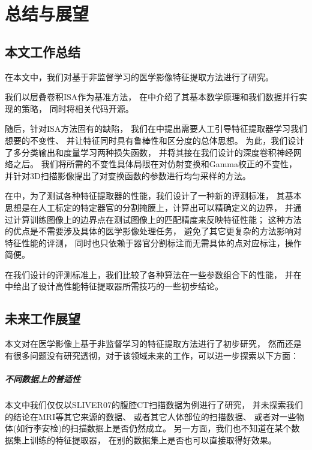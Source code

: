 
\chapter{总结与展望\label{chap:discuss}}

\section{本文工作总结}
在本文中，我们对基于非监督学习的医学影像特征提取方法进行了研究。

我们以层叠卷积ISA作为基准方法，
在中介绍了其基本数学原理和我们数据并行实现的策略，
同时将相关代码开源。

随后，针对ISA方法固有的缺陷，
我们在中提出需要人工引导特征提取器学习我们想要的不变性、
并让特征同时具有鲁棒性和区分度的总体思想。
为此，我们设计了多分类输出和度量学习两种损失函数，
并将其接在我们设计的深度卷积神经网络之后。
我们将所需的不变性具体局限在对仿射变换和Gamma校正的不变性，
并针对3D扫描影像提出了对变换函数的参数进行均匀采样的方法。

在中，为了测试各种特征提取器的性能，我们设计了一种新的评测标准，
其基本思想是在人工标定的特定器官的分割掩膜上，计算出可以精确定义的边界，
并通过计算训练图像上的边界点在测试图像上的匹配精度来反映特征性能；
这种方法的优点是不需要涉及具体的医学影像处理任务，
避免了其它更复杂的方法影响对特征性能的评测，
同时也只依赖于器官分割标注而无需具体的点对应标注，操作简便。

在我们设计的评测标准上，我们比较了各种算法在一些参数组合下的性能，
并在中给出了设计高性能特征提取器所需技巧的一些初步结论。

\section{未来工作展望}
本文对在医学影像上基于非监督学习的特征提取方法进行了初步研究，
然而还是有很多问题没有研究透彻，对于该领域未来的工作，可以进一步探索以下方面：

\paragraph{不同数据上的普适性}
本文中我们仅仅以SLIVER07的腹腔CT扫描数据为例进行了研究，
并未探索我们的结论在MRI等其它来源的数据、
或者其它人体部位的扫描数据、
或者对一些物体(如行李安检)的扫描数据上是否仍然成立。
另一方面，我们也不知道在某个数据集上训练的特征提取器，
在别的数据集上是否也可以直接取得好效果。

